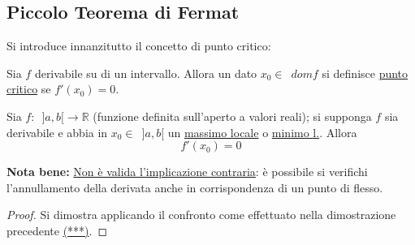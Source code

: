 \documentclass[10pt]{article}
\theoremstyle{plain}
\begin{document}
\subsection{Piccolo Teorema di Fermat}
Si introduce innanzitutto il concetto di punto critico:
\begin{defin}
\label{critico}
Sia $f$ derivabile su di un intervallo. Allora un dato $x_0 \in \enspace dom f$ si definisce \underline{punto critico} se $f'(x_0) = 0$.
\end{defin}

\begin{ther}
Sia $f: \enspace ]a, b[ \rightarrow \mathbb{R}$ (funzione definita sull'aperto a valori reali); si supponga $f$ sia derivabile e abbia in $x_0 \in \enspace ]a, b[$ un \underline{massimo locale} o \underline{minimo l.}. Allora \[f'(x_0) = 0\]
\end{ther}
\textbf{Nota bene:} \underline{Non è valida l'implicazione contraria}: è possibile si verifichi l'annullamento della derivata anche in corrispondenza di un punto di flesso.
\begin{proof}
Si dimostra applicando il confronto come effettuato nella dimostrazione precedente \hyperlink{confr}{(***)}.
\end{proof}
\end{document}
